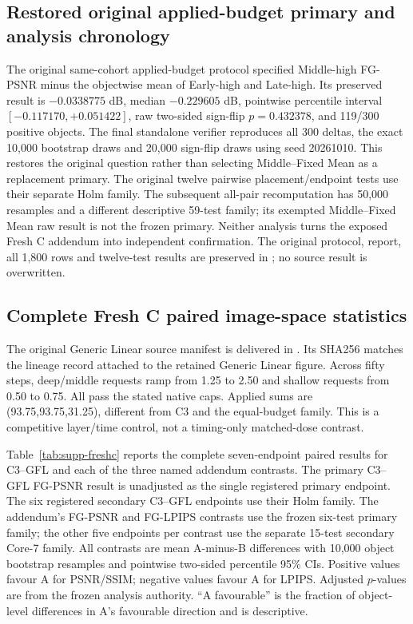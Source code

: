 \documentclass[11pt]{article}
\begin{document}
\subsection*{Restored original applied-budget primary and analysis chronology}
The original same-cohort applied-budget protocol specified Middle-high FG-PSNR minus the objectwise mean of Early-high and Late-high. Its preserved result is $-0.0338775$ dB, median $-0.229605$ dB, pointwise percentile interval $[-0.117170,+0.051422]$, raw two-sided sign-flip $p=0.432378$, and 119/300 positive objects. The final standalone verifier reproduces all 300 deltas, the exact 10,000 bootstrap draws and 20,000 sign-flip draws using seed 20261010. This restores the original question rather than selecting Middle--Fixed Mean as a replacement primary. The original twelve pairwise placement/endpoint tests use their separate Holm family. The subsequent all-pair recomputation has 50,000 resamples and a different descriptive 59-test family; its exempted Middle--Fixed Mean raw result is not the frozen primary. Neither analysis turns the exposed Fresh C addendum into independent confirmation. The original protocol, report, all 1,800 rows and twelve-test results are preserved in ; no source result is overwritten.

\subsection*{Complete Fresh C paired image-space statistics}
The original Generic Linear source manifest is delivered in . Its SHA256 matches the lineage record attached to the retained Generic Linear figure. Across fifty steps, deep/middle requests ramp from 1.25 to 2.50 and shallow requests from 0.50 to 0.75. All pass the stated native caps. Applied sums are (93.75,93.75,31.25), different from C3 and the equal-budget family. This is a competitive layer/time control, not a timing-only matched-dose contrast.

Table~\ref{tab:supp-freshc} reports the complete seven-endpoint paired results for C3--GFL and each of the three named addendum contrasts. The primary C3--GFL FG-PSNR result is unadjusted as the single registered primary endpoint. The six registered secondary C3--GFL endpoints use their Holm family. The addendum's FG-PSNR and FG-LPIPS contrasts use the frozen six-test primary family; the other five endpoints per contrast use the separate 15-test secondary Core-7 family. All contrasts are mean A-minus-B differences with 10,000 object bootstrap resamples and pointwise two-sided percentile 95\% CIs. Positive values favour A for PSNR/SSIM; negative values favour A for LPIPS. Adjusted $p$-values are from the frozen analysis authority. “A favourable” is the fraction of object-level differences in A's favourable direction and is descriptive.
\end{document}
